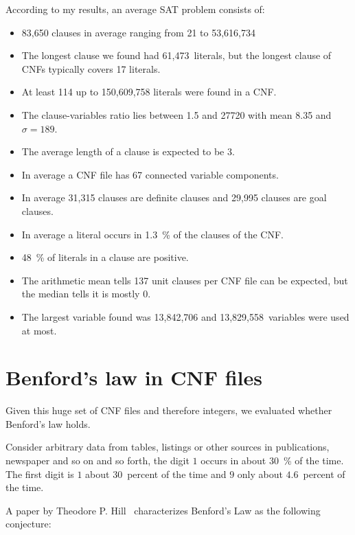 According to my results, an average SAT problem consists of:
\begin{itemize}
  \item 83,650 clauses in average ranging from 21 to 53,616,734
  \item The longest clause we found had 61,473~literals, but the longest clause of CNFs typically covers 17 literals.
  \item At least 114 up to 150,609,758 literals were found in a CNF.
  \item The clause-variables ratio lies between 1.5 and 27720 with mean 8.35 and $\sigma = 189$.
  \item The average length of a clause is expected to be 3.
  \item In average a CNF file has 67 connected variable components.
  \item In average 31,315 clauses are definite clauses and 29,995 clauses are goal clauses.
  \item In average a literal occurs in 1.3~\% of the clauses of the CNF.
  \item 48~\% of literals in a clause are positive.
  \item The arithmetic mean tells 137 unit clauses per CNF file can be expected, but the median tells it is mostly 0.
  \item The largest variable found was 13,842,706 and 13,829,558~variables were used at most.
\end{itemize}

\section{Benford's law in CNF files}
\label{sec:benford}
%
Given this huge set of CNF files and therefore integers, we evaluated whether Benford's law holds.

\begin{theorem}
  Consider arbitrary data from tables, listings or other sources in publications, newspaper
  and so on and so forth, the digit $1$ occurs in about 30~\% of the time.
  The first digit is $1$ about $30$~percent of the time
  and $9$ only about $4.6$~percent of the time.
\end{theorem}
  A paper by Theodore P. Hill~\cite{hill1998first} characterizes Benford's Law
  as the following conjecture:
